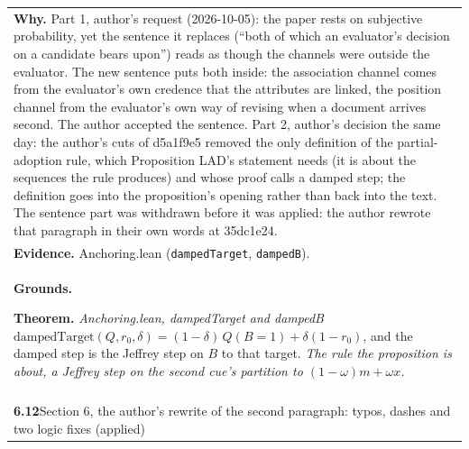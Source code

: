 \documentclass[10pt]{article}
\theoremstyle{definition}
\newlength{\fullw}\setlength{\fullw}{25.9cm}
\newcommand{\entryhead}[2]{\multicolumn{3}{|l|}{\rule{0pt}{2.6ex}\large\textbf{#1}\quad #2} \\ \hline}
\begin{document}
{\begin{longtable}{|p{0.9cm}|p{12.2cm}|p{12.2cm}|}
\multicolumn{3}{|p{\fullw}|}{\textbf{Why.} Part 1, author's request (2026-10-05): the paper rests on subjective probability, yet the sentence it replaces (``both of which an evaluator's decision on a candidate bears upon'') reads as though the channels were outside the evaluator. The new sentence puts both inside: the association channel comes from the evaluator's own credence that the attributes are linked, the position channel from the evaluator's own way of revising when a document arrives second. The author accepted the sentence. Part 2, author's decision the same day: the author's cuts of d5a1f9e5 removed the only definition of the partial-adoption rule, which Proposition LAD's statement needs (it is about the sequences the rule produces) and whose proof calls a damped step; the definition goes into the proposition's opening rather than back into the text. The sentence part was withdrawn before it was applied: the author rewrote that paragraph in their own words at 35dc1e24.} \\
\multicolumn{3}{|p{\fullw}|}{\textbf{Evidence.} Anchoring.lean (\texttt{dampedTarget}, \texttt{dampedB}).} \\ \hline
\multicolumn{3}{|p{\fullw}|}{\textbf{Grounds.}\par \textbf{Theorem.} \textit{Anchoring.lean, dampedTarget and dampedB} \newline $\mathrm{dampedTarget}(Q,r_0,\delta)=(1-\delta)\,Q(B{=}1)+\delta(1-r_0)$, and the damped step
is the Jeffrey step on $B$ to that target. \newline \textit{The rule the proposition is about, a Jeffrey step on the second cue's partition to $(1-\omega)m+\omega x$.}} \\ \hline
\multicolumn{3}{|l|}{} \\ \hline
\entryhead{6.12}{Section 6, the author's rewrite of the second paragraph: typos, dashes and two logic fixes (applied)\quad{\footnotesize\textit{(formerly C.32)}}}

\end{longtable}}
\end{document}
